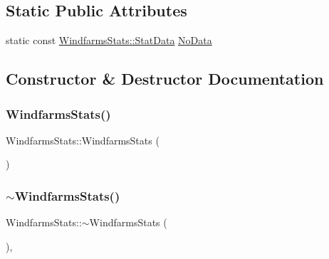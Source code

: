 \subsection*{Static Public Attributes}
\begin{DoxyCompactItemize}
\item 
static const \mbox{\hyperlink{struct_windfarms_stats_1_1_stat_data}{Windfarms\+Stats\+::\+Stat\+Data}} \mbox{\hyperlink{class_windfarms_stats_a89b5430d0020bb2677aa2097ac2edd5d}{No\+Data}}
\end{DoxyCompactItemize}


\subsection{Constructor \& Destructor Documentation}
\mbox{\label{class_windfarms_stats_aba60bee523b07ba4ea4b202ea7229d23}} 
\subsubsection{\texorpdfstring{WindfarmsStats()}{WindfarmsStats()}\hspace{0.1cm}{\footnotesize\ttfamily [1/3]}}
{\footnotesize\ttfamily Windfarms\+Stats\+::\+Windfarms\+Stats (\begin{DoxyParamCaption}{ }\end{DoxyParamCaption})}

\mbox{\label{class_windfarms_stats_a15f855267e9899e8643f928fc8798a74}} 
\subsubsection{\texorpdfstring{$\sim$WindfarmsStats()}{~WindfarmsStats()}}
{\footnotesize\ttfamily Windfarms\+Stats\+::$\sim$\+Windfarms\+Stats (\begin{DoxyParamCaption}{ }\end{DoxyParamCaption})\hspace{0.3cm}{\ttfamily [default]}, {\ttfamily [noexcept]}}

\mbox{\label{class_windfarms_stats_afdd188df19fd0687a95718050c358ca9}} 
